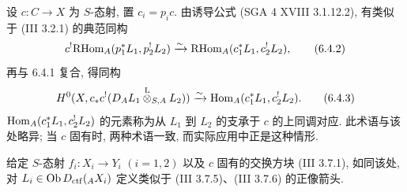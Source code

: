 设 $c:C\to X$ 为 $S$-态射, 置 $c_i=p_ic$. 由诱导公式 (SGA 4 XVIII 3.1.12.2), 有类似于 (III 3.2.1) 的典范同构
\begin{equation}
c^!\mathrm{RHom}_A(p_1^*L_1,p_2^!L_2)
\xrightarrow{\sim}
\mathrm{RHom}_A(c_1^*L_1,c_2^!L_2),
\tag{6.4.2}
\end{equation}
再与 6.4.1 复合, 得同构
\begin{equation}
H^0(X,c_*c^!(D_AL_1\overset{\mathrm L}{\otimes}_{S,A}L_2))
\xrightarrow{\sim}
\operatorname{Hom}_A(c_1^*L_1,c_2^!L_2).
\tag{6.4.3}
\end{equation}
$\operatorname{Hom}_A(c_1^*L_1,c_2^!L_2)$ 的元素称为从 $L_1$ 到 $L_2$ 的支承于 $c$ 的上同调对应. 此术语与该处略异; 当 $c$ 固有时, 两种术语一致, 而实际应用中正是这种情形.

给定 $S$-态射 $f_i:X_i\to Y_i$ $(i=1,2)$ 以及 $c$ 固有的交换方块 (III 3.7.1), 如同该处, 对 $L_i\in\operatorname{Ob} D_{\mathrm{ctf}}({}_AX_i)$ 定义类似于 (III 3.7.5)、(III 3.7.6) 的正像箭头.

